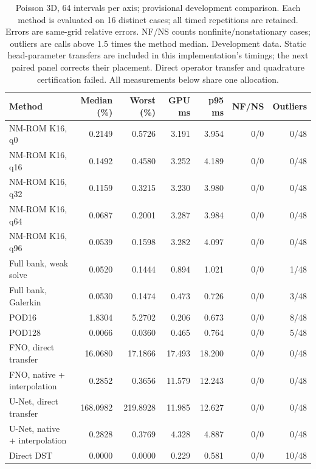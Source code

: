 \begin{table}[htbp]
\centering
\small
\setlength{\tabcolsep}{3pt}
\begin{tabular}{lrrrrrr}
\toprule
Method & Median (\%) & Worst (\%) & GPU ms & p95 ms & NF/NS & Outliers \\
\midrule
NM-ROM K16, q0 & 0.2149 & 0.5726 & 3.191 & 3.954 & 0/0 & 0/48 \\
NM-ROM K16, q16 & 0.1492 & 0.4580 & 3.252 & 4.189 & 0/0 & 0/48 \\
NM-ROM K16, q32 & 0.1159 & 0.3215 & 3.230 & 3.980 & 0/0 & 0/48 \\
NM-ROM K16, q64 & 0.0687 & 0.2001 & 3.287 & 3.984 & 0/0 & 0/48 \\
NM-ROM K16, q96 & 0.0539 & 0.1598 & 3.282 & 4.097 & 0/0 & 0/48 \\
Full bank, weak solve & 0.0520 & 0.1444 & 0.894 & 1.021 & 0/0 & 1/48 \\
Full bank, Galerkin & 0.0530 & 0.1474 & 0.473 & 0.726 & 0/0 & 3/48 \\
POD16 & 1.8304 & 5.2702 & 0.206 & 0.673 & 0/0 & 8/48 \\
POD128 & 0.0066 & 0.0360 & 0.465 & 0.764 & 0/0 & 5/48 \\
FNO, direct transfer & 16.0680 & 17.1866 & 17.493 & 18.200 & 0/0 & 0/48 \\
FNO, native + interpolation & 0.2852 & 0.3656 & 11.579 & 12.243 & 0/0 & 0/48 \\
U-Net, direct transfer & 168.0982 & 219.8928 & 11.985 & 12.627 & 0/0 & 0/48 \\
U-Net, native + interpolation & 0.2828 & 0.3769 & 4.328 & 4.887 & 0/0 & 0/48 \\
Direct DST & 0.0000 & 0.0000 & 0.229 & 0.581 & 0/0 & 10/48 \\
\bottomrule
\end{tabular}
\caption{Poisson 3D, 64 intervals per axis; provisional development comparison. Each method is evaluated on 16 distinct cases; all timed repetitions are retained. Errors are same-grid relative errors. NF/NS counts nonfinite/nonstationary cases; outliers are calls above 1.5 times the method median. Development data. Static head-parameter transfers are included in this implementation's timings; the next paired panel corrects their placement. Direct operator transfer and quadrature certification failed. All measurements below share one allocation.}
\label{tab:poisson3d-tuned02-n64}
\end{table}
